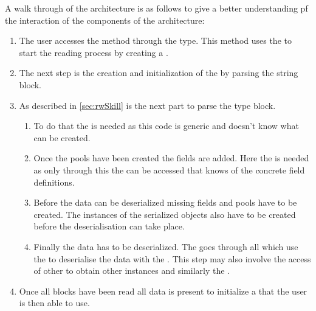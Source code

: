 \documentclass[thesis]{subfiles}
\begin{document}
  A walk through of the architecture is as follows to give a better understanding pf the interaction of the components of the architecture:
  \begin{enumerate}
    \item
          The user accesses the \static \open method through the \SkillFile type.
          This method uses the \SkillFileBuilder to start the reading process by creating a \FileReader.
    \item
          The next step is the creation and initialization of the \StringPool by parsing the string block.
    \item
          As described in \autoref{sec:rwSkill} is the next part to parse the type block.
          \begin{enumerate}
            \item
                  To do that the \PoolMaker is needed as this code is generic and doesn't know what \UserTypePools can be created.
            \item
                  Once the pools have been created the fields are added.
                  Here the \PoolProxy \trait is needed as only through this \trait the \PartsMaker can be accessed that knows of the concrete field definitions.
            \item
                  Before the data can be deserialized missing fields and pools have to be created.
                  The instances of the serialized objects also have to be created before the deserialisation can take place.
            \item
                  Finally the data has to be deserialized.
                  The \SkillFileBuilder goes through all \UserTypePools which use the \FieldDeclarations to deserialise the data with the \FileReader.
                  This step may also involve the access of other \UserTypePools to obtain other \UserType instances and similarly the \StringPool.
          \end{enumerate}
    \item Once all blocks have been read all data is present to initialize a \SkillFile that the user is then able to use.
  \end{enumerate}
\end{document}
